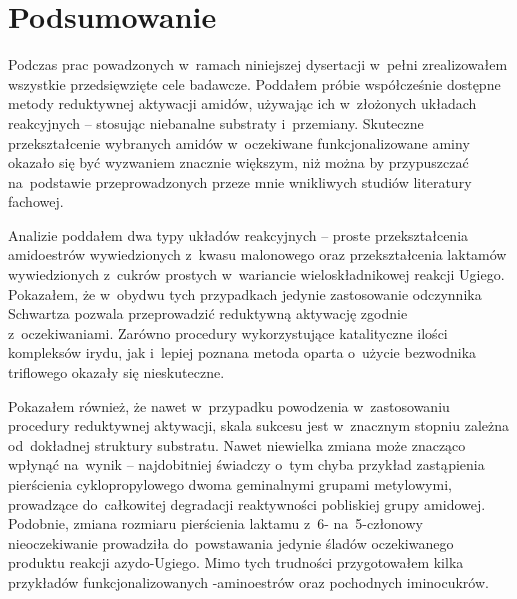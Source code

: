 \chapter{Podsumowanie}\label{chapter:conclusions}
Podczas prac powadzonych w~ramach niniejszej dysertacji w~pełni zrealizowałem wszystkie
  przedsięwzięte cele badawcze.
Poddałem próbie współcześnie dostępne metody reduktywnej aktywacji amidów,
  używając ich w~złożonych układach reakcyjnych \--- stosując niebanalne substraty i~przemiany.
Skuteczne przekształcenie wybranych amidów w~oczekiwane funkcjonalizowane aminy okazało się
  być wyzwaniem znacznie większym, niż można by przypuszczać na~podstawie przeprowadzonych
  przeze mnie wnikliwych studiów literatury fachowej.

Analizie poddałem dwa typy układów reakcyjnych \--- proste przekształcenia amidoestrów
  wywiedzionych z~kwasu malonowego oraz przekształcenia laktamów wywiedzionych
  z~cukrów prostych w~wariancie wieloskładnikowej reakcji Ugiego.
Pokazałem, że w~obydwu tych przypadkach jedynie zastosowanie odczynnika Schwartza pozwala
  przeprowadzić reduktywną aktywację zgodnie z~oczekiwaniami.
Zarówno procedury wykorzystujące katalityczne ilości kompleksów irydu, jak i~lepiej poznana
  metoda oparta o~użycie bezwodnika triflowego okazały się nieskuteczne.

Pokazałem również, że nawet w~przypadku powodzenia w~zastosowaniu procedury reduktywnej aktywacji,
  skala sukcesu jest w~znacznym stopniu zależna od~dokładnej struktury substratu.
Nawet niewielka zmiana może znacząco wpłynąć na~wynik \--- najdobitniej świadczy o~tym chyba
  przykład zastąpienia pierścienia cyklopropylowego dwoma geminalnymi grupami metylowymi,
  prowadzące do~całkowitej degradacji reaktywności pobliskiej grupy amidowej.
Podobnie, zmiana rozmiaru pierścienia laktamu z~6- na~5-członowy nieoczekiwanie prowadziła
  do~powstawania jedynie śladów oczekiwanego produktu reakcji azydo-Ugiego.
Mimo tych trudności przygotowałem kilka przykładów funkcjonalizowanych \textbeta-aminoestrów
  oraz pochodnych iminocukrów.


